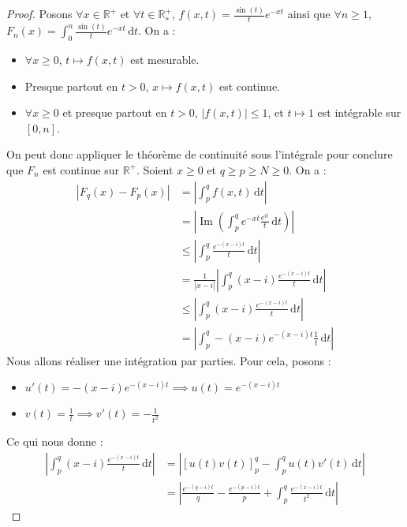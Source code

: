 	\begin{proof}
		Posons $\forall x \in \mathbb{R}^+$ et $\forall t \in \mathbb{R}^+_*$, $f(x,t) = \frac{\sin(t)}{t} e^{-xt}$ ainsi que $\forall n \geq 1$, $F_n(x) = \int_0^n \frac{\sin(t)}{t} e^{-xt} \, \mathrm{d}t$. On a :
		\begin{itemize}
			\item $\forall x \geq 0$, $t \mapsto f(x, t)$ est mesurable.
			\item Presque partout en $t > 0$, $x \mapsto f(x, t)$ est continue.
			\item $\forall x \geq 0$ et presque partout en $t > 0$, $|f(x,t)| \leq 1$, et $t \mapsto 1$ est intégrable sur $[0,n]$.
		\end{itemize}
		On peut donc appliquer le théorème de continuité sous l'intégrale pour conclure que $F_n$ est continue sur $\mathbb{R}^+$.
		\newpar
		Soient $x \geq 0$ et $q \geq p \geq N \geq 0$. On a :
		\begin{align*}
			|F_q(x) - F_p(x)| &= \left| \int_p^q f(x,t) \, \mathrm{d}t \right| \\
			&= \left| \operatorname{Im} \left( \int_p^q e^{-xt} \frac{e^{it}}{t} \, \mathrm{d}t \right) \right| \\
			&\leq \left| \int_p^q \frac{e^{-(x-i)t}}{t} \, \mathrm{d}t \right| \\
			&= \frac{1}{|x-i|} \left| \int_p^q (x-i) \frac{e^{-(x-i)t}}{t} \, \mathrm{d}t \right| \\
			&\leq \left| \int_p^q (x-i) \frac{e^{-(x-i)t}}{t} \, \mathrm{d}t \right| \\
			&= \left| \int_p^q -(x-i) e^{-(x-i)t} \frac{1}{t} \, \mathrm{d}t \right|
		\end{align*}
		Nous allons réaliser une intégration par parties. Pour cela, posons :
		\begin{itemize}
			\item $u'(t) = -(x-i) e^{-(x-i)t} \implies u(t) = e^{-(x-i)t}$
			\item $v(t) = \frac{1}{t} \implies v'(t) = -\frac{1}{t^2}$
		\end{itemize}
		Ce qui nous donne :
		\begin{align*}
			\left| \int_p^q (x-i) \frac{e^{-(x-i)t}}{t} \, \mathrm{d}t \right| &= \left| \left[ u(t)v(t) \right]_p^q - \int_p^q u(t) v'(t) \, \mathrm{d}t \right| \\
			&= \left| \frac{e^{-(q-i)t}}{q} - \frac{e^{-(p-i)t}}{p} +  \int_p^q \frac{e^{-(x-i)t}}{t^2} \, \mathrm{d}t \right|
		\end{align*}

\end{proof}

